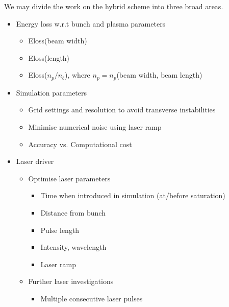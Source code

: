 \clearpage
We may divide the work on the hybrid scheme into three broad areas. 
\begin{itemize}
\item Energy loss w.r.t bunch and plasma parameters
\begin{itemize}
\item Eloss(beam width)
\item Eloss(length)
\item Eloss($n_p/n_b$), where $n_p=n_p$(beam width, beam length)
\end{itemize}
\item Simulation parameters
\begin{itemize}
\item Grid settings and resolution to avoid transverse instabilities
\item Minimise numerical noise using laser ramp
\item Accuracy vs. Computational cost
\end{itemize}
\item Laser driver 
\begin{itemize}
\item Optimise laser parameters
\begin{itemize}
\item Time when introduced in simulation (at/before saturation)
\item Distance from bunch
\item Pulse length
\item Intensity, wavelength
\item Laser ramp
\end{itemize}
\item Further laser investigations
\begin{itemize}
\item Multiple consecutive laser pulses
\end{itemize}
\end{itemize}
\end{itemize}
